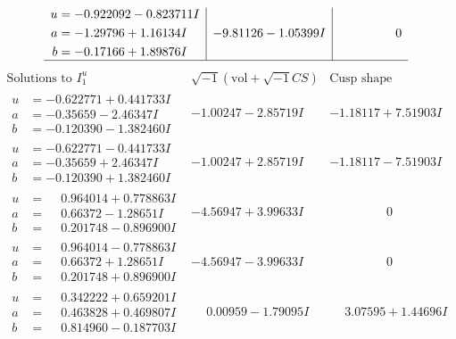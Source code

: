 \documentclass[1p]{elsarticle_modified}
\theoremstyle{definition}
\newcommand{\I}{\sqrt{-1}}
\begin{document}
$$\begin{array}{c|c|c}
\begin{aligned}
u &= -0.922092 - 0.823711 I \\
a &= -1.29796 + 1.16134 I \\
b &= -0.17166 + 1.89876 I\end{aligned}
 & -9.81126 - 1.05399 I & \phantom{-0.000000 } 0\\
 \hline 
 \end{array}$$\newpage$$\begin{array}{c|c|c}  
\text{Solutions to }I^u_{1}& \I (\text{vol} + \sqrt{-1}CS) & \text{Cusp shape}\\
 \hline 
\begin{aligned}
u &= -0.622771 + 0.441733 I \\
a &= -0.35659 - 2.46347 I \\
b &= -0.120390 - 1.382460 I\end{aligned}
 & -1.00247 - 2.85719 I & -1.18117 + 7.51903 I \\ \hline\begin{aligned}
u &= -0.622771 - 0.441733 I \\
a &= -0.35659 + 2.46347 I \\
b &= -0.120390 + 1.382460 I\end{aligned}
 & -1.00247 + 2.85719 I & -1.18117 - 7.51903 I \\ \hline\begin{aligned}
u &= \phantom{-}0.964014 + 0.778863 I \\
a &= \phantom{-}0.66372 - 1.28651 I \\
b &= \phantom{-}0.201748 - 0.896900 I\end{aligned}
 & -4.56947 + 3.99633 I & \phantom{-0.000000 } 0 \\ \hline\begin{aligned}
u &= \phantom{-}0.964014 - 0.778863 I \\
a &= \phantom{-}0.66372 + 1.28651 I \\
b &= \phantom{-}0.201748 + 0.896900 I\end{aligned}
 & -4.56947 - 3.99633 I & \phantom{-0.000000 } 0 \\ \hline\begin{aligned}
u &= \phantom{-}0.342222 + 0.659201 I \\
a &= \phantom{-}0.463828 + 0.469807 I \\
b &= \phantom{-}0.814960 - 0.187703 I\end{aligned}
 & \phantom{-}0.00959 - 1.79095 I & \phantom{-}3.07595 + 1.44696 I \\ \hline\begin{aligned}

\end{aligned}
\end{array}$$
\end{document}
